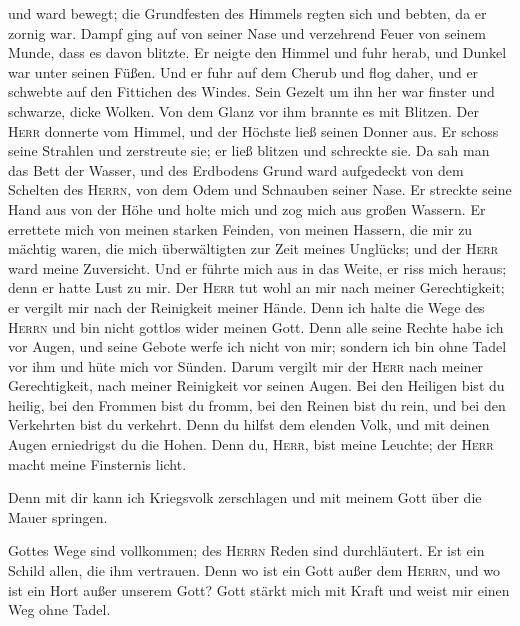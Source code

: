 und ward bewegt; die Grundfesten des Himmels regten sich und bebten, da
er zornig war.  Dampf ging auf von seiner Nase und
verzehrend Feuer von seinem Munde, dass es davon blitzte.
 Er neigte den Himmel und fuhr herab, und Dunkel war
unter seinen Füßen.  Und er fuhr auf dem Cherub und flog
daher, und er schwebte auf den Fittichen des Windes. 
Sein Gezelt um ihn her war finster und schwarze, dicke Wolken.
 Von dem Glanz vor ihm brannte es mit Blitzen.
 Der \textsc{Herr} donnerte vom Himmel, und der Höchste
ließ seinen Donner aus.  Er schoss seine Strahlen und
zerstreute sie; er ließ blitzen und schreckte sie.  Da
sah man das Bett der Wasser, und des Erdbodens Grund ward aufgedeckt von
dem Schelten des \textsc{Herrn}, von dem Odem und Schnauben seiner Nase.
 Er streckte seine Hand aus von der Höhe und holte mich
und zog mich aus großen Wassern.  Er errettete mich von
meinen starken Feinden, von meinen Hassern, die mir zu mächtig waren,
 die mich überwältigten zur Zeit meines Unglücks; und der
\textsc{Herr} ward meine Zuversicht.  Und er führte mich
aus in das Weite, er riss mich heraus; denn er hatte Lust zu mir.
 Der \textsc{Herr} tut wohl an mir nach meiner
Gerechtigkeit; er vergilt mir nach der Reinigkeit meiner Hände.
 Denn ich halte die Wege des \textsc{Herrn} und bin nicht
gottlos wider meinen Gott.  Denn alle seine Rechte habe
ich vor Augen, und seine Gebote werfe ich nicht von mir; 
sondern ich bin ohne Tadel vor ihm und hüte mich vor Sünden.
 Darum vergilt mir der \textsc{Herr} nach meiner
Gerechtigkeit, nach meiner Reinigkeit vor seinen Augen. 
Bei den Heiligen bist du heilig, bei den Frommen bist du fromm,
 bei den Reinen bist du rein, und bei den Verkehrten bist
du verkehrt.  Denn du hilfst dem elenden Volk, und mit
deinen Augen erniedrigst du die Hohen.  Denn du,
\textsc{Herr}, bist meine Leuchte; der \textsc{Herr} macht meine
Finsternis licht.

 Denn mit dir kann ich Kriegsvolk zerschlagen und mit
meinem Gott über die Mauer springen.

 Gottes Wege sind vollkommen; des \textsc{Herrn} Reden
sind durchläutert. Er ist ein Schild allen, die ihm vertrauen.
 Denn wo ist ein Gott außer dem \textsc{Herrn}, und wo
ist ein Hort außer unserem Gott?  Gott stärkt mich mit
Kraft und weist mir einen Weg ohne Tadel.

